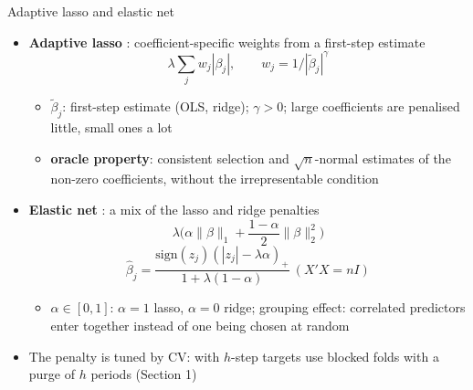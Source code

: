 \begin{frame}{Adaptive lasso and elastic net}
\itemsize{\small}
\begin{itemize}
    \item \textbf{Adaptive lasso} : coefficient-specific weights from a first-step estimate
    \[ \lambda\sum_j w_j|\beta_j|, \qquad w_j = 1/|\tilde\beta_j|^\gamma \]
    \begin{itemize}
        \item $\tilde\beta_j$: first-step estimate (OLS, ridge); $\gamma > 0$; large coefficients are penalised little, small ones a lot
        \item \textbf{oracle property}: consistent selection and $\sqrt n$-normal estimates of the non-zero coefficients, without the irrepresentable condition
    \end{itemize}
    \item \textbf{Elastic net} : a mix of the lasso and ridge penalties
    \[ \lambda\Big(\alpha\|\beta\|_1 + \frac{1 - \alpha}2\|\beta\|_2^2\Big) \]
    \[ \hat\beta_j = \frac{\mathrm{sign}(z_j)(|z_j| - \lambda\alpha)_+}{1 + \lambda(1 - \alpha)} \ (X'X = nI) \]
    \begin{itemize}
        \item $\alpha \in [0, 1]$: $\alpha = 1$ lasso, $\alpha = 0$ ridge; grouping effect: correlated predictors enter together instead of one being chosen at random
    \end{itemize}
    \item The penalty is tuned by CV: with $h$-step targets use blocked folds with a purge of $h$ periods (Section 1)
\end{itemize}
\end{frame}

